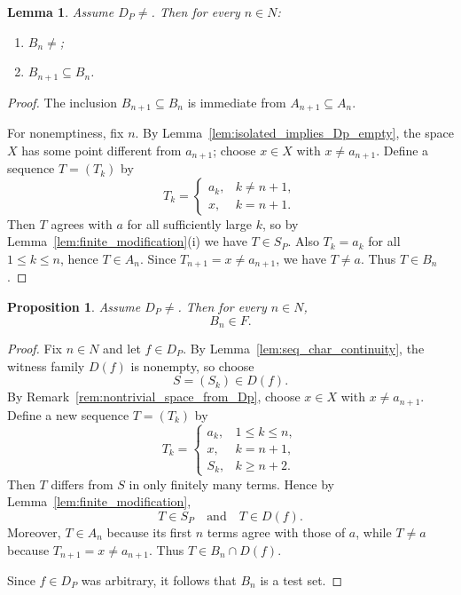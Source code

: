 \documentclass[11pt]{amsart}
\theoremstyle{plain}
\newtheorem{lemma}[theorem]{Lemma}
\newtheorem{proposition}[theorem]{Proposition}
\theoremstyle{definition}
\theoremstyle{remark}
\newcommand{\Sp}{\mathcal{S}_P}
\newcommand{\Dp}{\mathcal{D}_P}
\newcommand{\F}{\mathcal{F}}
\newcommand{\N}{\mathbb{N}}
\def\Sp{S_P}%
\def\Dp{D_P}%
\def\F{F}%
\def\N{N}%
\def\emptyset{}%
\begin{document}
\begin{lemma}\label{lem:Bn_chain}
Assume $\Dp\neq\emptyset$.
Then for every $n\in\N$:
\begin{enumerate}[label=(\roman*)]
\item $B_n\neq\emptyset$;
\item $B_{n+1}\subseteq B_n$.
\end{enumerate}
\end{lemma}

\begin{proof}
The inclusion $B_{n+1}\subseteq B_n$ is immediate from $A_{n+1}\subseteq A_n$.

For nonemptiness, fix $n$.
By Lemma~\ref{lem:isolated_implies_Dp_empty}, the space $X$ has some point different from $a_{n+1}$; choose $x\in X$ with $x\neq a_{n+1}$.
Define a sequence $T=(T_k)$ by
\[
T_k=
\begin{cases}
a_k,& k\neq n+1,\\
x,& k=n+1.
\end{cases}
\]
Then $T$ agrees with $a$ for all sufficiently large $k$, so by Lemma~\ref{lem:finite_modification}(i) we have $T\in\Sp$.
Also $T_k=a_k$ for all $1\le k\le n$, hence $T\in A_n$.
Since $T_{n+1}=x\neq a_{n+1}$, we have $T\neq a$.
Thus $T\in B_n$.
\end{proof}

\begin{proposition}\label{prop:Bn_is_testset}
Assume $\Dp\neq\emptyset$.
Then for every $n\in\N$,
\[
B_n\in\F.
\]
\end{proposition}

\begin{proof}
Fix $n\in\N$ and let $f\in\Dp$.
By Lemma~\ref{lem:seq_char_continuity}, the witness family $D(f)$ is nonempty, so choose
\[
S=(S_k)\in D(f).
\]
By Remark~\ref{rem:nontrivial_space_from_Dp}, choose $x\in X$ with $x\neq a_{n+1}$.
Define a new sequence $T=(T_k)$ by
\[
T_k=
\begin{cases}
a_k,& 1\le k\le n,\\
x,& k=n+1,\\
S_k,& k\ge n+2.
\end{cases}
\]
Then $T$ differs from $S$ in only finitely many terms.
Hence by Lemma~\ref{lem:finite_modification},
\[
T\in\Sp \quad\text{and}\quad T\in D(f).
\]
Moreover, $T\in A_n$ because its first $n$ terms agree with those of $a$, while
$T\neq a$ because $T_{n+1}=x\neq a_{n+1}$.
Thus $T\in B_n\cap D(f)$.

Since $f\in\Dp$ was arbitrary, it follows that $B_n$ is a test set.
\end{proof}
\end{document}
